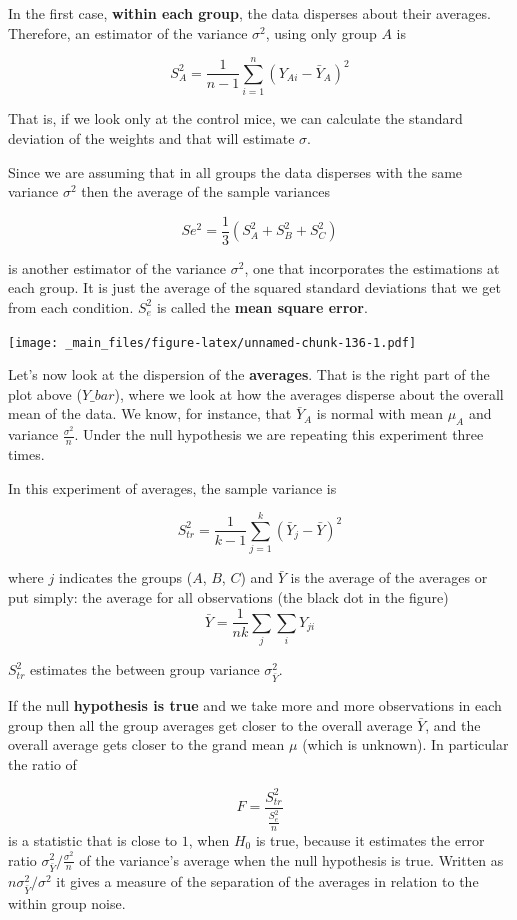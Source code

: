 \documentclass[
]{book}
\begin{document}
In the first case, \textbf{within each group}, the data disperses about their averages. Therefore, an estimator of the variance \(\sigma^2\), using only
group \(A\) is

\[S_A^2=\frac{1}{n-1} \sum_{i=1}^n (Y_{Ai}-\bar{Y}_{A})^2\]

That is, if we look only at the control mice, we can calculate the standard deviation of the weights and that will estimate \(\sigma\).

Since we are assuming that in all groups the data disperses with the same variance \(\sigma^2\) then the average of the sample variances

\[Se^2 = \frac{1}{3}(S_A^2+S_B^2+S_C^2)\]

is another estimator of the variance \(\sigma^2\), one that incorporates the estimations at each group. It is just the average of the squared standard deviations that we get from each condition. \(S_e^2\) is called the \textbf{mean square error}.

\texttt{[image: \_main\_files/figure-latex/unnamed-chunk-136-1.pdf]}

Let's now look at the dispersion of the \textbf{averages}. That is the right part of the plot above (\(Y\_bar\)), where we look at how the averages disperse about the overall mean of the data. We know, for instance, that \(\bar{Y}_A\) is normal with mean \(\mu_A\) and variance \(\frac{\sigma^2}{n}\). Under the null hypothesis we are repeating this experiment three times.

In this experiment of averages, the sample variance is

\[S^2_{tr}=\frac{1}{k-1} \sum_{j=1}^k(\bar{Y}_{j}-\bar{Y})^2\]

where \(j\) indicates the groups (\(A\), \(B\), \(C\)) and \(\bar{Y}\) is the average of the averages or put simply: the average for all observations (the black dot in the figure) \[\bar{Y}=\frac{1}{nk}\sum_j \sum_i Y_{ji}\]

\(S^2_{tr}\) estimates the between group variance \(\sigma^2_{\bar{Y}}\).

If the null \textbf{hypothesis is true} and we take more and more observations in each group then all the group averages get closer to the overall average \(\bar{Y}\), and the overall average gets closer to the grand mean \(\mu\) (which is unknown). In particular the ratio of

\[F=\frac{S_{tr}^2}{\frac{S_e^2}{n}}\]
is a statistic that is close to \(1\), when \(H_0\) is true, because it estimates the error ratio \(\sigma^2_{\bar{Y}}/\frac{\sigma^2}{n}\) of the variance's average when the null hypothesis is true. Written as \(n \sigma^2_{\bar{Y}}/\sigma^2\) it gives a measure of the separation of the averages in relation to the within group noise.
\end{document}
